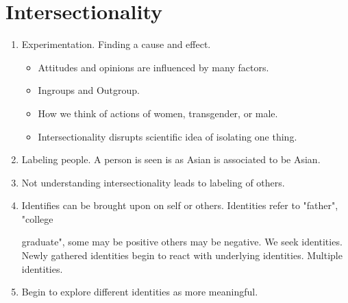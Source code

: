 \documentclass{article}
\begin{document}
\section*{Intersectionality}
\begin{enumerate}
    \item Experimentation. Finding a cause and effect. 
    \begin{itemize}
        \item Attitudes and opinions are influenced by many factors. 
        \item Ingroups and Outgroup.
        \item How we think of actions of women, transgender, or male. 
        \item Intersectionality disrupts scientific idea of isolating one thing. 
    \end{itemize}
    \item Labeling people. A person is seen is as Asian is associated to be Asian. 
    \item Not understanding intersectionality leads to labeling of others.
    \item Identifies can be brought upon on self or others. Identities refer to "father", "college
    
    graduate", some may be positive others may be negative. We seek identities. Newly gathered identities begin to react with underlying identities. Multiple identities. 
    \item Begin to explore different identities as more meaningful. 
\end{enumerate}
\end{document}
